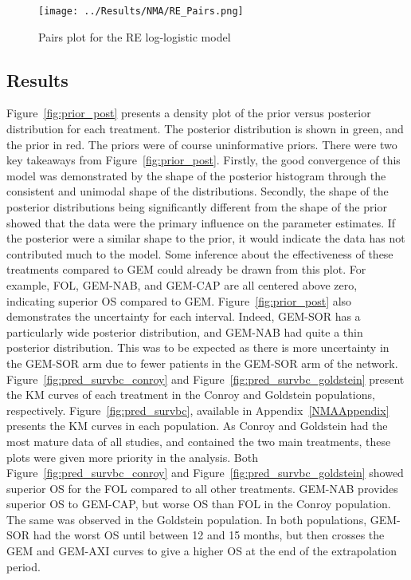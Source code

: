 \begin{figure}[h]
    \centering
    \texttt{[image: ../Results/NMA/RE\_Pairs.png]}
    \caption{Pairs plot for the RE log-logistic model}
    \label{fig:RE_pairs}
\end{figure}


\subsection{Results}
Figure~\ref{fig:prior_post} presents a density plot of the prior versus posterior distribution for each treatment. The posterior distribution is shown in green, and the prior in red. The priors were of course uninformative priors. There were two key takeaways from Figure~\ref{fig:prior_post}. Firstly, the good convergence of this model was demonstrated by the shape of the posterior histogram through the consistent and unimodal shape of the distributions. Secondly, the shape of the posterior distributions being significantly different from the shape of the prior showed that the data were the primary influence on the parameter estimates. If the posterior were a similar shape to the prior, it would indicate the data has not contributed much to the model. Some inference about the effectiveness of these treatments compared to GEM could already be drawn from this plot. For example, FOL, GEM-NAB, and GEM-CAP are all centered above zero, indicating superior OS compared to GEM. Figure~\ref{fig:prior_post} also demonstrates the uncertainty for each interval. Indeed, GEM-SOR has a particularly wide posterior distribution, and GEM-NAB had quite a thin posterior distribution. This was to be expected as there is more uncertainty in the GEM-SOR arm due to fewer patients in the GEM-SOR arm of the network. \\

Figure~\ref{fig:pred_survbc_conroy} and Figure~\ref{fig:pred_survbc_goldstein} present the KM curves of each treatment in the Conroy and Goldstein populations, respectively. Figure~\ref{fig:pred_survbc}, available in Appendix~\ref{NMAAppendix} presents the KM curves in each population. As Conroy and Goldstein had the most mature data of all studies, and contained the two main treatments, these plots were given more priority in the analysis. Both Figure~\ref{fig:pred_survbc_conroy} and Figure~\ref{fig:pred_survbc_goldstein} showed superior OS for the FOL compared to all other treatments. GEM-NAB provides superior OS to GEM-CAP, but worse OS than FOL in the Conroy population. The same was observed in the Goldstein population. In both populations, GEM-SOR had the worst OS until between 12 and 15 months, but then crosses the GEM and GEM-AXI curves to give a higher OS at the end of the extrapolation period. \\

